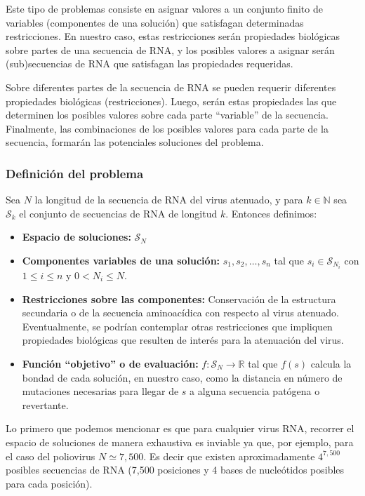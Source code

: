 Este tipo de problemas consiste en asignar valores a un conjunto finito de
variables (componentes de una soluci\'on) que satisfagan determinadas
restricciones. En nuestro caso, estas restricciones ser\'an propiedades
biol\'ogicas sobre partes de una secuencia de \ac{RNA}, y los posibles valores a
asignar ser\'an (sub)secuencias de \ac{RNA} que satisfagan las propiedades
requeridas.

Sobre diferentes partes de la secuencia de \ac{RNA} se pueden requerir
diferentes propiedades biol\'ogicas (restricciones). Luego, ser\'an estas
propiedades las que determinen los posibles valores sobre cada parte
``variable'' de la secuencia. Finalmente, las combinaciones de los posibles
valores para cada parte de la secuencia, formar\'an las potenciales soluciones
del problema.

\subsubsection{Definici\'on del problema}

Sea $N$ la longitud de la secuencia de \ac{RNA} del virus atenuado, y para $k
\in \mathbb{N}$ sea $\mathcal{S}_{k}$ el conjunto de secuencias de \ac{RNA} de
longitud $k$. Entonces definimos:

\begin{itemize} 
 \item \textbf{Espacio de soluciones:} $\mathcal{S}_{N}$

 \item \textbf{Componentes variables de una soluci\'on:} $s_{1},s_{2}, \dots,
s_{n}$ tal que $s_{i} \in \mathcal{S}_{N_{i}}$ con $1 \le i \le n$ y $0 < N_{i}
\le N$.

 \item \textbf{Restricciones sobre las componentes:} Conservaci\'on de la
estructura secundaria o de la secuencia aminoac\'idica con respecto al virus
atenuado. Eventualmente, se podr\'ian contemplar otras restricciones que
impliquen propiedades biol\'ogicas que resulten de inter\'es para la
atenuaci\'on del virus.

 \item \textbf{Funci\'on ``objetivo'' o de evaluaci\'on:} $f: \mathcal{S}_{N}
\rightarrow \mathbb{R}$ tal que $f(s)$ calcula la bondad de cada soluci\'on, en
nuestro caso, como la distancia en n\'umero de mutaciones necesarias para
llegar de $s$ a alguna secuencia pat\'ogena o revertante.
\end{itemize}

Lo primero que podemos mencionar es que para cualquier virus \ac{RNA}, recorrer
el espacio de soluciones de manera exhaustiva es inviable ya que, por ejemplo,
para el caso del poliovirus $N \simeq 7,500$. Es decir que existen
aproximadamente $4^{7,500}$ posibles secuencias de \ac{RNA} (7,500
posiciones y 4 bases de nucle\'otidos posibles para cada posici\'on).

